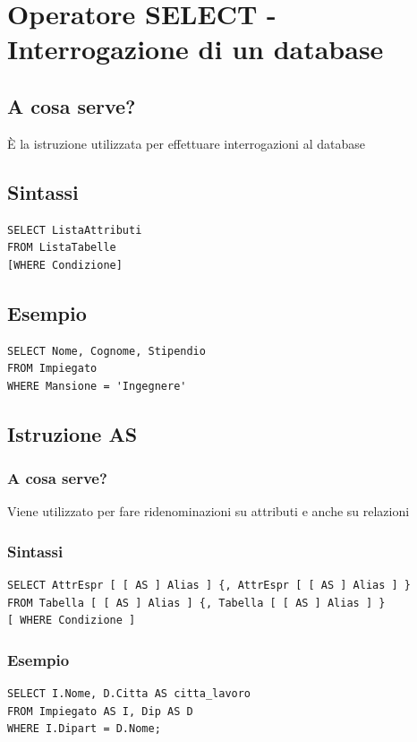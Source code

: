\chapter{Operatore SELECT - Interrogazione di un database}
\section{A cosa serve?}
È la istruzione utilizzata per effettuare interrogazioni al database

\section{Sintassi}
\begin{lstlisting}[language=sql_generic]
SELECT ListaAttributi
FROM ListaTabelle
[WHERE Condizione]
\end{lstlisting}

\section{Esempio}
\begin{lstlisting}[language=sql_generic]
SELECT Nome, Cognome, Stipendio
FROM Impiegato
WHERE Mansione = 'Ingegnere'
\end{lstlisting}

\section{Istruzione AS}
\subsection{A cosa serve?}
Viene utilizzato per fare ridenominazioni su attributi e anche su relazioni

\subsection{Sintassi}
\begin{lstlisting}[language=sql_generic]
SELECT AttrEspr [ [ AS ] Alias ] {, AttrEspr [ [ AS ] Alias ] }
FROM Tabella [ [ AS ] Alias ] {, Tabella [ [ AS ] Alias ] }
[ WHERE Condizione ]
\end{lstlisting}

\subsection{Esempio}
\begin{lstlisting}[language=sql_generic]
SELECT I.Nome, D.Citta AS citta_lavoro
FROM Impiegato AS I, Dip AS D
WHERE I.Dipart = D.Nome;
\end{lstlisting}

